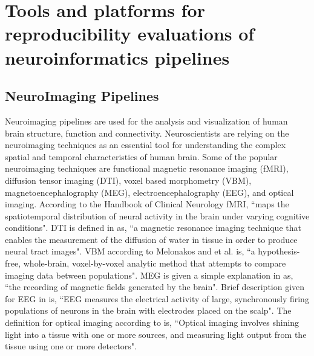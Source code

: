 \chapter{Tools and platforms for reproducibility evaluations of neuroinformatics pipelines}


\section{NeuroImaging Pipelines}
Neuroimaging pipelines are used for the analysis and visualization of human brain structure, function and connectivity. Neuroscientists are relying on the neuroimaging techniques as an essential tool for understanding the complex spatial and temporal characteristics of human brain. Some of the popular neuroimaging techniques are functional magnetic resonance imaging (fMRI), diffusion tensor imaging (DTI), voxel based morphometry (VBM), magnetoencephalography (MEG), electroencephalography (EEG), and optical imaging. According  to the Handbook of Clinical Neurology \cite{BUCHBINDER201661} fMRI, ``maps the spatiotemporal distribution of neural activity in the brain under varying cognitive conditions". DTI is defined in \cite{Rizea11} as, ``a magnetic resonance imaging technique that enables the measurement of the diffusion of water in tissue in order to produce neural tract images". VBM according to Melonakos and et al. \cite{MELONAKOS201165} is, ``a hypothesis-free, whole-brain, voxel-by-voxel analytic method that attempts to compare imaging data between populations". MEG is given a simple explanation in \cite{Sato1985} as, ``the recording of magnetic fields generated by the brain". Brief description given for EEG in \cite{Light2010} is, ``EEG measures the electrical activity of large, synchronously firing populations of neurons in the brain with electrodes placed on the scalp". The definition for optical imaging according to \cite{doi:10.1080/23273798.2017.1290810} is, ``Optical imaging involves shining light into a tissue with one or more sources, and measuring light output from the tissue using one or more detectors".

